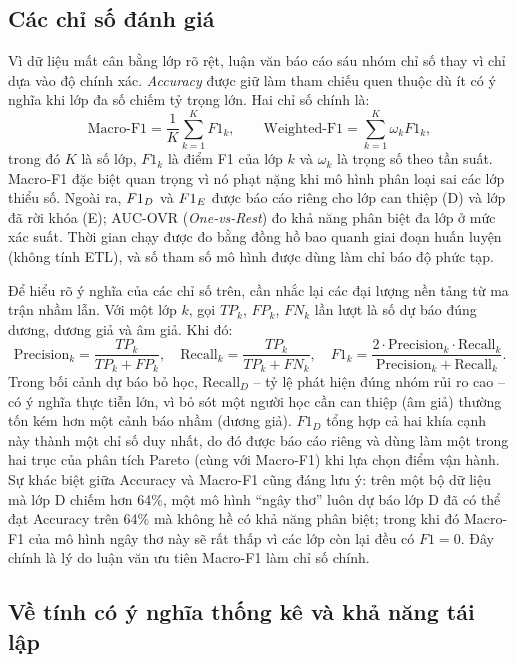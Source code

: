 \subsection{Các chỉ số đánh giá}
\label{sec:chiso}

Vì dữ liệu mất cân bằng lớp rõ rệt, luận văn báo cáo sáu nhóm chỉ số thay vì chỉ dựa vào độ chính xác. \textit{Accuracy} được giữ làm tham chiếu quen thuộc dù ít có ý nghĩa khi lớp đa số chiếm tỷ trọng lớn. Hai chỉ số chính là:
\begin{equation}
\text{Macro-F1} = \frac{1}{K} \sum_{k=1}^{K} F1_k, \qquad
\text{Weighted-F1} = \sum_{k=1}^{K} \omega_k F1_k,
\end{equation}
trong đó $K$ là số lớp, $F1_k$ là điểm F1 của lớp $k$ và $\omega_k$ là trọng số theo tần suất. Macro-F1 đặc biệt quan trọng vì nó phạt nặng khi mô hình phân loại sai các lớp thiểu số. Ngoài ra, $F1_{D}$ và $F1_{E}$ được báo cáo riêng cho lớp can thiệp (D) và lớp đã rời khóa (E); AUC-OVR (\textit{One-vs-Rest}) đo khả năng phân biệt đa lớp ở mức xác suất. Thời gian chạy được đo bằng đồng hồ bao quanh giai đoạn huấn luyện (không tính ETL), và số tham số mô hình được dùng làm chỉ báo độ phức tạp.

Để hiểu rõ ý nghĩa của các chỉ số trên, cần nhắc lại các đại lượng nền tảng từ ma trận nhầm lẫn. Với một lớp $k$, gọi $TP_k$, $FP_k$, $FN_k$ lần lượt là số dự báo đúng dương, dương giả và âm giả. Khi đó:
\begin{equation}
\text{Precision}_k = \frac{TP_k}{TP_k + FP_k}, \quad
\text{Recall}_k = \frac{TP_k}{TP_k + FN_k}, \quad
F1_k = \frac{2 \cdot \text{Precision}_k \cdot \text{Recall}_k}{\text{Precision}_k + \text{Recall}_k}.
\end{equation}
Trong bối cảnh dự báo bỏ học, $\text{Recall}_D$ -- tỷ lệ phát hiện đúng nhóm rủi ro cao -- có ý nghĩa thực tiễn lớn, vì bỏ sót một người học cần can thiệp (âm giả) thường tốn kém hơn một cảnh báo nhầm (dương giả). $F1_D$ tổng hợp cả hai khía cạnh này thành một chỉ số duy nhất, do đó được báo cáo riêng và dùng làm một trong hai trục của phân tích Pareto (cùng với Macro-F1) khi lựa chọn điểm vận hành. Sự khác biệt giữa Accuracy và Macro-F1 cũng đáng lưu ý: trên một bộ dữ liệu mà lớp D chiếm hơn 64\%, một mô hình ``ngây thơ'' luôn dự báo lớp D đã có thể đạt Accuracy trên 64\% mà không hề có khả năng phân biệt; trong khi đó Macro-F1 của mô hình ngây thơ này sẽ rất thấp vì các lớp còn lại đều có $F1 = 0$. Đây chính là lý do luận văn ưu tiên Macro-F1 làm chỉ số chính.

\subsection{Về tính có ý nghĩa thống kê và khả năng tái lập}

